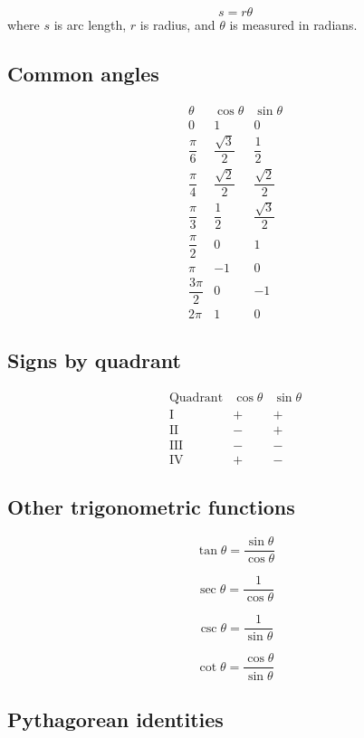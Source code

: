 \[
\boxed{
    s=r\theta
}
\]
where \(s\) is arc length, \(r\) is radius, and \(\theta\) is measured in radians.

\subsection*{Common angles}

\[
\begin{array}{c|cc}
\theta & \cos\theta & \sin\theta \\ \hline
0 & 1 & 0\\[1mm]
\dfrac{\pi}{6} & \dfrac{\sqrt3}{2} & \dfrac12\\[3mm]
\dfrac{\pi}{4} & \dfrac{\sqrt2}{2} & \dfrac{\sqrt2}{2}\\[3mm]
\dfrac{\pi}{3} & \dfrac12 & \dfrac{\sqrt3}{2}\\[3mm]
\dfrac{\pi}{2} & 0 & 1\\[2mm]
\pi & -1 & 0\\[1mm]
\dfrac{3\pi}{2} & 0 & -1\\[3mm]
2\pi & 1 & 0
\end{array}
\]

\subsection*{Signs by quadrant}

\[
\begin{array}{c|cc}
\text{Quadrant} & \cos\theta & \sin\theta \\ \hline
\text{I} & + & +\\
\text{II} & - & +\\
\text{III} & - & -\\
\text{IV} & + & -
\end{array}
\]

\subsection*{Other trigonometric functions}

\[
\boxed{
    \tan\theta=\frac{\sin\theta}{\cos\theta}
}
\]

\[
\boxed{
    \sec\theta=\frac1{\cos\theta}
}
\]

\[
\boxed{
    \csc\theta=\frac1{\sin\theta}
}
\]

\[
\boxed{
    \cot\theta=\frac{\cos\theta}{\sin\theta}
}
\]

\subsection*{Pythagorean identities}

